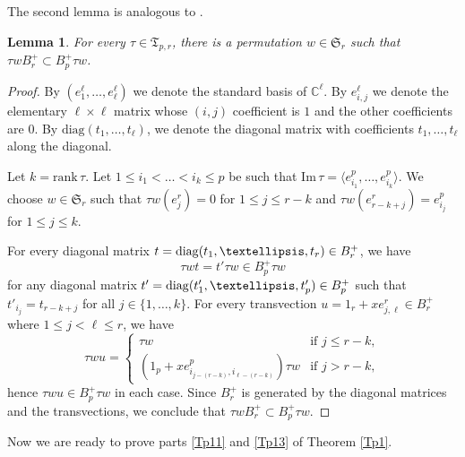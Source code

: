 \documentclass[11pt]{article}
\newtheorem{lemma}[theo]{Lemma}
\theoremstyle{definition}
\numberwithin{equation}{section}
\newcommand{\rank}{\mathrm{rank}}
\newcommand{\Span}[1]{\langle #1\rangle}
\newcommand{\permutationsof}[1]{\mathfrak{S}_{#1}}
\newcommand{\ppermutationsof}{\mathfrak{T}}
\newcommand{\mC}{\mathbb{C}}
\newcommand{\diag}{\qopname\relax o{diag}}
\begin{document}
The second lemma is analogous to \cite[Lemma 8.2]{FN2}.

\begin{lemma}
\label{L3.3}
For every $\tau\in\ppermutationsof_{p,r}$, there is a permutation $w\in\permutationsof{r}$
such that $\tau w B_r^+\subset B_p^+\tau w$.
\end{lemma}

\begin{proof}
By $(e_1^\ell,\ldots,e_\ell^\ell)$ we denote the standard basis of $\mC^\ell$. By $e_{i,j}^\ell$ we denote the elementary $\ell\times \ell$ matrix
whose $(i,j)$ coefficient is $1$ and the other coefficients are $0$. By $\mathrm{diag}(t_1,\ldots,t_\ell)$, we denote the diagonal matrix with coefficients $t_1,\ldots,t_\ell$ along the diagonal.

Let $k=\rank\,\tau$. Let $1\leq i_1<\ldots<i_k\leq p$ be such that $\mathrm{Im}\,\tau=\Span{e_{i_1}^p,\ldots,e_{i_k}^p}$.
We choose $w\in\permutationsof{r}$ such that $\tau w(e_j^r)=0$ for $1\leq j\leq r-k$ and $\tau w(e_{r-k+j}^r)=e_{i_j}^p$
for $1\leq j\leq k$.

For every diagonal matrix $t=\diag(t_1,\ldots,t_r)\in B_r^+$, we have
\[\tau w t=t'\tau w\in B_p^+\tau w\]
for any diagonal matrix $t'=\diag(t'_1,\ldots,t'_p)\in B_p^+$ such that $t'_{i_j}=t_{r-k+j}$ for all $j\in\{1,\ldots,k\}$.
For every transvection $u=1_r+xe_{j,\ell}^r\in B_r^+$ where $1\leq j<\ell\leq r$, we have
\[
\tau w u=\left\{\begin{array}{ll}
\tau w & \mbox{if $j\leq r-k$},\\
(1_p+xe_{i_{j-(r-k)},i_{\ell-(r-k)}}^p)\tau w & \mbox{if $j>r-k$},
\end{array}\right.
\]
hence $\tau wu\in B_p^+\tau w$ in each case. Since $B_r^+$ is generated by the diagonal matrices and the transvections, we conclude that $\tau w B_r^+\subset B_p^+\tau w$.
\end{proof}

Now we are ready to prove parts \ref{Tp11} and \ref{Tp13} of Theorem \ref{Tp1}.
\end{document}
